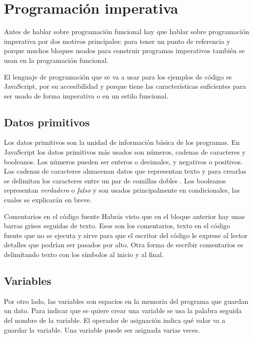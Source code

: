 \documentclass{article}
\newcommand{\code}[1]{\tcbox{\texttt{#1}}}
\newcommand{\codejs}[1]{\tcbox{\lstinline[style=ES6]{#1}}}
\begin{document}
\section*{Programación imperativa}
Antes de hablar sobre programación funcional hay que hablar sobre programación imperativa por dos motivos principales: para tener un punto de referencia y porque muchos bloques usados para construir programas imperativos también se usan en la programación funcional.

El lenguaje de programación que se va a usar para los ejemplos de código es JavaScript, por su accesibilidad y porque tiene las características suficientes para ser usado de forma imperativa o en un estilo funcional.\cite{why-js}

\subsection*{Datos primitivos}
Los datos primitivos son la unidad de información básica de los programas. En JavaScript los datos primitivos más usados son números, cadenas de caracteres y booleanos. Los números pueden ser enteros o decimales, y negativos o positivos. Las cadenas de caracteres almacenan datos que representan texto y para crearlas se delimitan los caracteres entre un par de comillas dobles \code{\textquotedbl\textquotedbl}. Los booleanos representan \textit{verdadero} o \textit{falso} y son usados principalmente en condicionales, las cuales se explicarán en breve.



\begin{bclogo}[logo=\bcinfo, couleurBarre=orange, noborder=true, couleur=white]{Comentarios en el código fuente}
Habrás visto que en el bloque anterior hay unas barras grises \code{//} seguidas de texto. Esos son los comentarios, texto en el código fuente que no se ejecuta y sirve para que el escritor del código le exprese al lector detalles que podrían ser pasados por alto.
\newline
Otra forma de escribir comentarios es delimitando texto con los símbolos \code{/*} al inicio y \code{*/} al final.
\end{bclogo}

\subsection*{Variables}
Por otro lado, las variables son espacios en la memoria del programa que guardan un dato. Para indicar que se quiere crear una variable se usa la palabra \codejs{let} seguida del nombre de la variable. El operador de asignación \codejs{=} indica qué valor va a guardar la variable. Una variable puede ser asignada varias veces.
\end{document}
